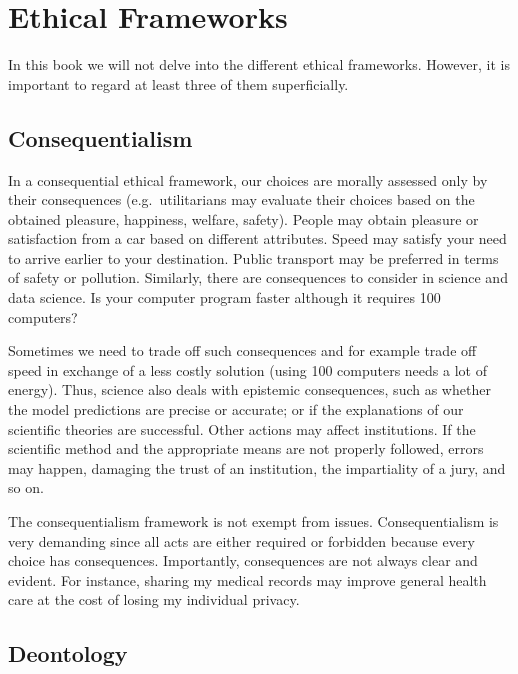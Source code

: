 \documentclass[
]{book}
\begin{document}
\hypertarget{ethical-frameworks}{%
\section{Ethical Frameworks}\label{ethical-frameworks}}

In this book we will not delve into the different ethical frameworks. However, it is important to regard at least three of them superficially.

\hypertarget{consequentialism}{%
\subsection{Consequentialism}\label{consequentialism}}

In a consequential ethical framework, our choices are morally assessed only by their consequences (e.g.~utilitarians may evaluate their choices based on the obtained pleasure, happiness, welfare, safety). People may obtain pleasure or satisfaction from a car based on different attributes. Speed may satisfy your need to arrive earlier to your destination. Public transport may be preferred in terms of safety or pollution. Similarly, there are consequences to consider in science and data science. Is your computer program faster although it requires 100 computers?

Sometimes we need to trade off such consequences and for example trade off speed in exchange of a less costly solution (using 100 computers needs a lot of energy). Thus, science also deals with epistemic consequences, such as whether the model predictions are precise or accurate; or if the explanations of our scientific theories are successful. Other actions may affect institutions. If the scientific method and the appropriate means are not properly followed, errors may happen, damaging the trust of an institution, the impartiality of a jury, and so on.

The consequentialism framework is not exempt from issues. Consequentialism is very demanding since all acts are either required or forbidden because every choice has consequences. Importantly, consequences are not always clear and evident. For instance, sharing my medical records may improve general health care at the cost of losing my individual privacy.

\hypertarget{deontology}{%
\subsection{Deontology}\label{deontology}}
\end{document}
